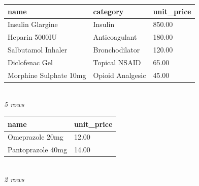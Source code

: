 {\scriptsize\setlength{\tabcolsep}{2.5pt}\begin{tabular}{lll}\toprule
\textbf{name} & \textbf{category} & \textbf{unit\_price} \\\midrule
Insulin Glargine & Insulin & 850.00 \\
Heparin 5000IU & Anticoagulant & 180.00 \\
Salbutamol Inhaler & Bronchodilator & 120.00 \\
Diclofenac Gel & Topical NSAID & 65.00 \\
Morphine Sulphate 10mg & Opioid Analgesic & 45.00 \\
\bottomrule\end{tabular}}\\[-1pt]{\tiny\itshape 5 rows}\\[4pt]
{\scriptsize\setlength{\tabcolsep}{2.5pt}\begin{tabular}{ll}\toprule
\textbf{name} & \textbf{unit\_price} \\\midrule
Omeprazole 20mg & 12.00 \\
Pantoprazole 40mg & 14.00 \\
\bottomrule\end{tabular}}\\[-1pt]{\tiny\itshape 2 rows}
